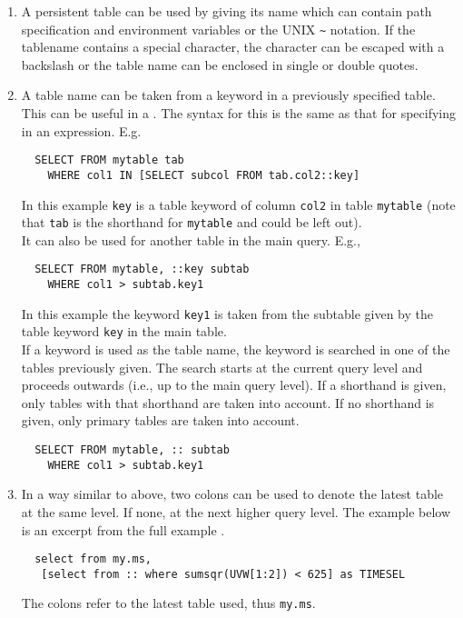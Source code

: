 \begin{enumerate}

\item
A persistent table  can be used by giving its name which can contain
path specification and environment variables or the UNIX
\verb+~+ notation. If the tablename contains a special character, the
character can be escaped with a backslash or the table name can be
enclosed in single or double quotes.

\item
A table name can be taken from a keyword in a previously
specified table. This can be useful in a
. The syntax for this is
the same as that for specifying 
in an expression. E.g.
\begin{verbatim}
  SELECT FROM mytable tab
    WHERE col1 IN [SELECT subcol FROM tab.col2::key]
\end{verbatim}
In this example \texttt{key} is a table keyword of column
\texttt{col2} in table \texttt{mytable} (note that \texttt{tab}
is the shorthand for \texttt{mytable} and could be left out).
\\It can also be used for another table in the main query. E.g.,
\begin{verbatim}
  SELECT FROM mytable, ::key subtab
    WHERE col1 > subtab.key1
\end{verbatim}
In this example the keyword \texttt{key1} is taken from the
subtable given by the table keyword \texttt{key} in the main
table.
\\If a keyword is used as the table name, the keyword is
searched
in one of the tables previously given. The search starts at
the current query level and proceeds outwards (i.e., up to the
main query level). If a shorthand is given, only tables with
that shorthand are taken into account. If no shorthand is
given, only primary tables are taken into account.
\begin{verbatim}
  SELECT FROM mytable, :: subtab
    WHERE col1 > subtab.key1
\end{verbatim}

\item
In a way similar to above, two colons can be used to denote the latest table
at the same level. If none, at the next higher query level. The example below is
an excerpt from the full example .
\begin{verbatim}
  select from my.ms,
   [select from :: where sumsqr(UVW[1:2]) < 625] as TIMESEL
\end{verbatim}
The colons refer to the latest table used, thus \texttt{my.ms}.


\end{enumerate}
